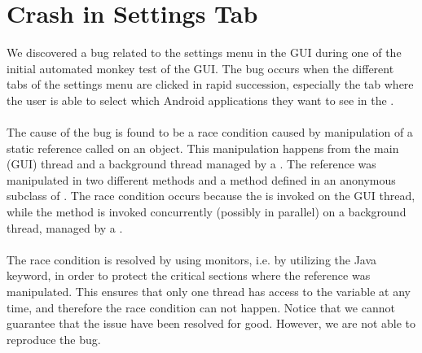\section{Crash in Settings Tab}
\label{sec:crash_in_settings_tab}

We discovered a bug related to the settings menu in the \launcher GUI during one of the initial automated monkey test of the GUI. The bug occurs when the different tabs of the settings menu are clicked in rapid succession, especially the tab where the user is able to select which Android applications they want to see in the \giraf \launcher.
\\\\
The cause of the bug is found to be a race condition caused by manipulation of a static reference called  on an  object. This manipulation happens from the main (GUI) thread and a background thread managed by a . The reference was manipulated in two different methods  and a method  defined in an anonymous subclass of . The race condition occurs because the  is invoked on the GUI thread, while the  method is invoked concurrently (possibly in parallel) on a background thread, managed by a .
\\\\
The race condition is resolved by using monitors, i.e. by utilizing the  Java keyword, in order to protect the critical sections where the  reference was manipulated. This ensures that only one thread has access to the variable at any time, and therefore the race condition can not happen. Notice that we cannot guarantee that the issue have been resolved for good. However, we are not able to reproduce the bug.